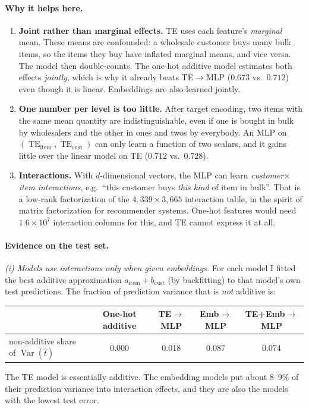 \documentclass[11pt]{article}
\newcommand{\TE}{\operatorname{TE}}
\begin{document}
\paragraph{Why it helps here.}
\begin{enumerate}
\item \textbf{Joint rather than marginal effects.} TE uses each feature's \emph{marginal} mean.
These means are confounded: a wholesale customer buys many bulk items, so the items they buy
have inflated marginal means, and vice versa. The model then double-counts. The one-hot
additive model estimates both effects \emph{jointly}, which is why it already beats
TE$\to$MLP ($0.673$ vs.\ $0.712$) even though it is linear. Embeddings are also learned jointly.
\item \textbf{One number per level is too little.} After target encoding, two items with the same
mean quantity are indistinguishable, even if one is bought in bulk by wholesalers and the other
in ones and twos by everybody. An MLP on $(\TE_{\text{item}},\TE_{\text{cust}})$ can only learn a
function of two scalars, and it gains little over the linear model on TE ($0.712$ vs.\ $0.728$).
\item \textbf{Interactions.} With $d$-dimensional vectors, the MLP can learn
\emph{customer$\times$item interactions}, e.g.\ ``this customer buys \emph{this kind} of item in
bulk''. That is a low-rank factorization of the $4{,}339\times3{,}665$ interaction table, in the
spirit of matrix factorization for recommender systems. One-hot features would need
$1.6\times10^7$ interaction columns for this, and TE cannot express it at all.
\end{enumerate}

\paragraph{Evidence on the test set.}

\emph{(i) Models use interactions only when given embeddings.} For each model I fitted the best
additive approximation $a_{\text{item}}+b_{\text{cust}}$ (by backfitting) to that model's own test
predictions. The fraction of prediction variance that is \emph{not} additive is:
\begin{center}
\begin{tabular}{lcccc}
\toprule
& One-hot additive & TE$\to$MLP & Emb$\to$MLP & TE+Emb$\to$MLP\\
\midrule
non-additive share of $\operatorname{Var}(\hat t)$ & 0.000 & 0.018 & 0.087 & 0.074\\
\bottomrule
\end{tabular}
\end{center}
The TE model is essentially additive. The embedding models put about 8--9\% of their prediction
variance into interaction effects, and they are also the models with the lowest test error.
\end{document}
